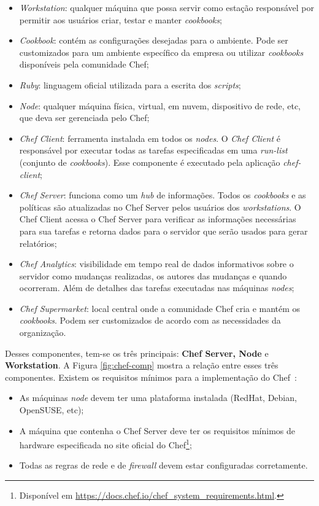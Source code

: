 \begin{itemize}
  \item \textit{Workstation}: qualquer máquina que possa servir como estação
    responsável por permitir aos usuários criar, testar e manter \textit{cookbooks};
  \item \textit{Cookbook}: contém as configurações desejadas para o ambiente.
    Pode ser customizados para um ambiente específico da empresa ou utilizar
    \textit{cookbooks} disponíveis pela comunidade Chef;
  \item \textit{Ruby}: linguagem oficial utilizada para a escrita dos \textit{scripts};
  \item \textit{Node}: qualquer máquina física, virtual, em nuvem, dispositivo
    de rede, etc, que deva ser gerenciada pelo Chef;
  \item \textit{Chef Client}: ferramenta instalada em todos os \textit{nodes}. O
    \textit{Chef Client} é responsável por executar todas as tarefas especificadas
    em uma \textit{run-list} (conjunto de \textit{cookbooks}). Esse componente é
    executado pela aplicação \textit{chef-client};
  \item \textit{Chef Server}: funciona como um \textit{hub} de informações. Todos os
    \textit{cookbooks} e as políticas são atualizadas no Chef Server pelos usuários
    dos \textit{workstations}. O Chef Client acessa o Chef Server para verificar
    as informações necessárias para sua tarefas e retorna dados para o servidor
    que serão usados para gerar relatórios;
  \item \textit{Chef Analytics}: visibilidade em tempo real de dados informativos
    sobre o servidor como mudanças realizadas, os autores das mudanças e quando
    ocorreram. Além de detalhes das tarefas executadas nas máquinas \textit{nodes};
  \item \textit{Chef Supermarket}: local central onde a comunidade Chef cria e
    mantém os \textit{cookbooks}. Podem ser customizados de acordo com as necessidades
    da organização.
\end{itemize}

Desses componentes, tem-se os três principais: \textbf{Chef Server, Node} e \textbf{Workstation}.
A Figura \ref{fig:chef-comp} mostra a relação entre esses três componentes. Existem os requisitos
mínimos para a implementação do Chef~\cite{chefdoc:2016}:

\begin{itemize}
  \item As máquinas \textit{node} devem ter uma plataforma instalada (RedHat,
    Debian, OpenSUSE, etc);
  \item A máquina que contenha o Chef Server deve ter os requisitos
      mínimos de hardware especificada no site oficial do Chef\footnote{Disponível em \url{https://docs.chef.io/chef\_system\_requirements.html}.};
  \item Todas as regras de rede e de \textit{firewall} devem estar configuradas
    corretamente.
\end{itemize}

